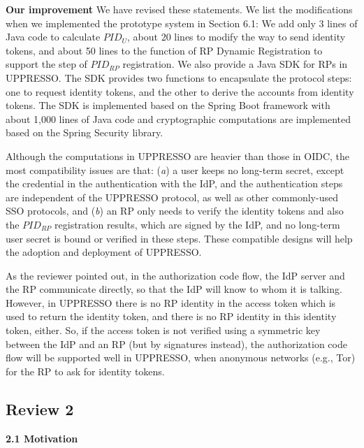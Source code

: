 \documentclass[letterpaper,onecolumn,10pt]{article}
\begin{document}

\vspace{1mm}\noindent\textbf{Our improvement}
We have revised these statements. We list the modifications when we implemented the prototype system in Section 6.1:
We add only 3 lines of Java code to calculate $PID_U$, about 20 lines to modify the way to send identity tokens,
 and about 50 lines to the function of RP Dynamic Registration to support the step of $PID_{RP}$ registration.
We also provide a Java SDK for RPs in UPPRESSO. 
The SDK provides two functions to encapsulate the protocol steps:
one to request identity tokens, and the other to derive the accounts from identity tokens.
 The SDK is implemented based on the Spring Boot framework with about 1,000 lines of Java code
  and cryptographic computations are implemented based on the Spring Security library.

Although the computations in UPPRESSO are heavier than those in OIDC,
    the most compatibility issues are that: (\emph{a}) a user keeps no long-term secret, except the credential in the authentication with the IdP,
        and the authentication steps are independent of the UPPRESSO protocol, as well as other commonly-used SSO protocols,
        and (\emph{b}) an RP only needs to verify the identity tokens and also the $PID_{RP}$ registration results, which are signed by the IdP,
                and no long-term user secret is bound or verified in these steps.
These compatible designs will help the adoption and deployment of UPPRESSO.

As the reviewer pointed out, 
    in the authorization code flow, the IdP server and the RP communicate directly, so that the IdP will know to whom it is talking.
However,
        in UPPRESSO there is no RP identity in the access token which is used to return the identity token,
            and there is no RP identity in this identity token, either.
So, if the access token is not verified using a symmetric key between the IdP and an RP (but by signatures instead),
    the authorization code flow will be supported well in UPPRESSO,
        when anonymous networks (e.g., Tor) for the RP to ask for identity tokens.

\subsection*{Review 2}
\noindent\textbf{2.1 Motivation}
\end{document}
